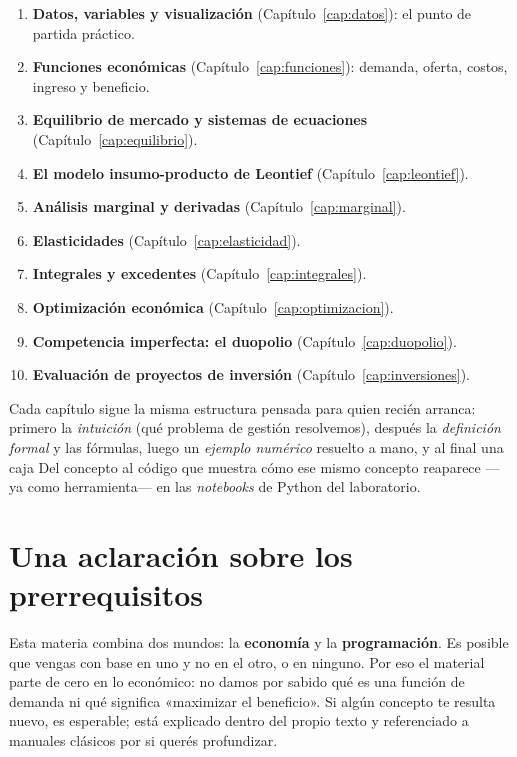 \begin{enumerate}
  \item \textbf{Datos, variables y visualización} (Capítulo~\ref{cap:datos}): el punto de partida práctico.
  \item \textbf{Funciones económicas} (Capítulo~\ref{cap:funciones}): demanda, oferta, costos, ingreso y beneficio.
  \item \textbf{Equilibrio de mercado y sistemas de ecuaciones} (Capítulo~\ref{cap:equilibrio}).
  \item \textbf{El modelo insumo-producto de Leontief} (Capítulo~\ref{cap:leontief}).
  \item \textbf{Análisis marginal y derivadas} (Capítulo~\ref{cap:marginal}).
  \item \textbf{Elasticidades} (Capítulo~\ref{cap:elasticidad}).
  \item \textbf{Integrales y excedentes} (Capítulo~\ref{cap:integrales}).
  \item \textbf{Optimización económica} (Capítulo~\ref{cap:optimizacion}).
  \item \textbf{Competencia imperfecta: el duopolio} (Capítulo~\ref{cap:duopolio}).
  \item \textbf{Evaluación de proyectos de inversión} (Capítulo~\ref{cap:inversiones}).
\end{enumerate}

Cada capítulo sigue la misma estructura pensada para quien recién arranca: primero la \emph{intuición} (qué problema de gestión resolvemos), después la \emph{definición formal} y las fórmulas, luego un \emph{ejemplo numérico} resuelto a mano, y al final una caja \textsf{Del concepto al código} que muestra cómo ese mismo concepto reaparece —ya como herramienta— en las \emph{notebooks} de Python del laboratorio.

\section{Una aclaración sobre los prerrequisitos}

Esta materia combina dos mundos: la \textbf{economía} y la \textbf{programación}. Es posible que vengas con base en uno y no en el otro, o en ninguno. Por eso el material parte de cero en lo económico: no damos por sabido qué es una función de demanda ni qué significa «maximizar el beneficio». Si algún concepto te resulta nuevo, es esperable; está explicado dentro del propio texto y referenciado a manuales clásicos por si querés profundizar.

